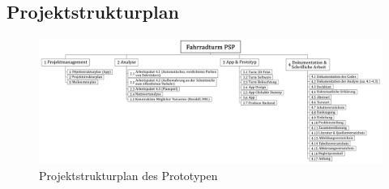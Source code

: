 \subsection{Projektstrukturplan}
\begin{figure}[ht]
  \centering
  \includegraphics[width=1\textwidth]{images/projektstrukturplan}
  \caption{Projektstrukturplan des Prototypen}
  \label{fig:projektstrukturplan}
\end{figure}